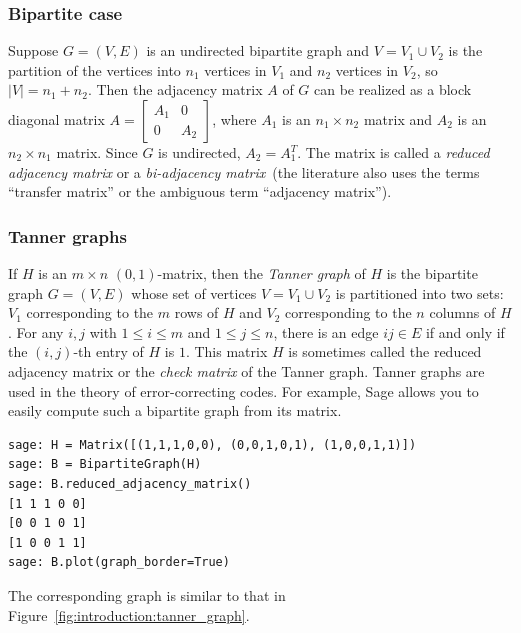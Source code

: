 \subsubsection{Bipartite case}

Suppose $G = (V, E)$ is an undirected bipartite graph and
$V = V_1 \cup V_2$ is the partition of the vertices into $n_1$
vertices in $V_1$ and $n_2$ vertices in $V_2$, so $|V| = n_1 + n_2$.
Then the adjacency matrix $A$ of $G$ can be realized as a block
diagonal matrix
$A
=
\begin{bmatrix}
A_1 & 0 \\
0 & A_2
\end{bmatrix}$,
where $A_1$ is an $n_1 \times n_2$ matrix and $A_2$ is an
$n_2 \times n_1$ matrix. Since $G$ is undirected, $A_2 = A_1^T$.
The matrix is called a
\emph{reduced adjacency matrix} or a
\emph{bi-adjacency matrix}~(the literature
also uses the terms ``transfer matrix'' or the ambiguous term
``adjacency matrix'').



\subsubsection{Tanner graphs}

If $H$ is an $m \times n$ $(0,1)$-matrix, then the
\emph{Tanner graph} of $H$ is the bipartite graph
$G = (V,E)$ whose set of vertices $V = V_1 \cup V_2$ is partitioned
into two sets: $V_1$ corresponding to the $m$ rows of $H$ and $V_2$
corresponding to the $n$ columns of $H$. For any $i,j$ with
$1 \leq i \leq m$ and $1 \leq j \leq n$, there is an edge $ij \in E$
if and only if the $(i,j)$-th entry of $H$ is $1$. This matrix $H$ is
sometimes called the reduced adjacency matrix or the
\emph{check matrix} of the
Tanner graph. Tanner graphs are used in the theory
of error-correcting codes. For example,
Sage allows you to easily compute such a bipartite graph from its
matrix.
\begin{lstlisting}
sage: H = Matrix([(1,1,1,0,0), (0,0,1,0,1), (1,0,0,1,1)])
sage: B = BipartiteGraph(H)
sage: B.reduced_adjacency_matrix()
[1 1 1 0 0]
[0 0 1 0 1]
[1 0 0 1 1]
sage: B.plot(graph_border=True)
\end{lstlisting}
The corresponding graph is similar to that in
Figure~\ref{fig:introduction:tanner_graph}.

